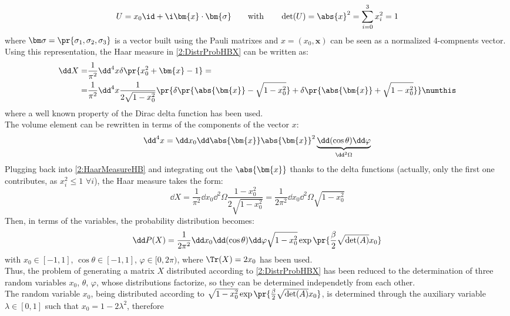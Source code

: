 \begin{equation}
    U=x_0\id+\i \bm{x} \cdot \bm{\sigma} \qquad\text{with}\qquad \det(U)=\abs{x}^2=\sum_{i=0}^3x_i^2=1 \label{2:SU2Repr}
\end{equation}
where $\bm\sigma=\pr{\sigma_1,\sigma_2,\sigma_3}$ is a vector built using the Pauli matrixes and $x=(x_0,\bm{x})$ can be seen as a normalized $4$-compnents vector.
Using this representation, the Haar measure in \eqref{2:DistrProbHBX} can be written as:
\begin{align*}
    \dd X =& \frac1{\pi^2} \dd^4x \delta\pr{x_0^2+\bm{x}-1} =\\
    =& \frac1{\pi^2} \dd^4x \frac{1}{2\sqrt{1-x_0^2}} \pr{\delta\pr{\abs{\bm{x}}-\sqrt{1-x_0^2}}+\delta\pr{\abs{\bm{x}}+\sqrt{1-x_0^2}}} \numthis\label{2:HaarMeasureHB}
\end{align*}
where a well known property of the Dirac delta function has been used.\\
The volume element can be rewritten in terms of the components of the vector $x$:
\begin{equation}
    \dd^4x = \dd x_0\dd\abs{\bm{x}}\abs{\bm{x}}^2\underbrace{\dd(\cos\theta)\dd\varphi}_{\dd^2\Omega} \label{2:VolumeElemParam}
\end{equation}
Plugging back into \eqref{2:HaarMeasureHB} and integrating out the $\abs{\bm{x}}$ thanks to the delta functions (actually, only the first one contributes, as $x_i^2\leq1$ $\forall i$), the Haar measure takes the form:
\begin{equation}
    \dd X = \frac1{\pi^2}\dd x_0\dd^2\Omega\frac{1-x_0^2}{2\sqrt{1-x_0^2}} = \frac1{2\pi^2} \dd x_0 \dd^2\Omega \sqrt{1-x_0^2} \label{2:HaarMeasureHBSimplified}
\end{equation}
Then, in terms of the variables, the probability distribution becomes:
\begin{equation}
    \dd P(X) = \frac1{2\pi^2} \dd x_0 \dd(\cos\theta) \dd\varphi \sqrt{1-x_0^2} \exp\pr{\frac\beta2 \sqrt{\det(A)}x_0} \label{2:DistrProbHBXSimplified}
\end{equation}
with $x_0\in[-1,1]$, $\cos\theta\in[-1,1]$, $\varphi\in[0,2\pi)$, where $\Tr(X)=2x_0$ has been used.\\
Thus, the problem of generating a matrix $X$ distributed according to \eqref{2:DistrProbHBX} has been reduced to the determination of three random variables $x_0$, $\theta$, $\varphi$, whose distributions factorize, so they can be determined independetly from each other.\\
The random variable $x_0$, being distributed according to $\sqrt{1-x_0^2} \exp\pr{\frac\beta2 \sqrt{\det(A)}x_0}$, is determined through the auxiliary variable $\lambda\in[0,1]$ such that $x_0 = 1-2\lambda^2$, therefore
